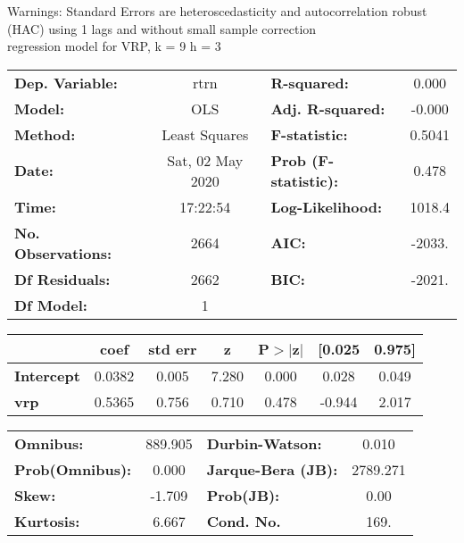 Warnings: \newline
 [1] Standard Errors are heteroscedasticity and autocorrelation robust (HAC) using 1 lags and without small sample correction\\ 

regression model for VRP, k = 9 h = 3\begin{center}
\begin{tabular}{lclc}
\toprule
\textbf{Dep. Variable:}    &       rtrn       & \textbf{  R-squared:         } &     0.000   \\
\textbf{Model:}            &       OLS        & \textbf{  Adj. R-squared:    } &    -0.000   \\
\textbf{Method:}           &  Least Squares   & \textbf{  F-statistic:       } &    0.5041   \\
\textbf{Date:}             & Sat, 02 May 2020 & \textbf{  Prob (F-statistic):} &    0.478    \\
\textbf{Time:}             &     17:22:54     & \textbf{  Log-Likelihood:    } &    1018.4   \\
\textbf{No. Observations:} &        2664      & \textbf{  AIC:               } &    -2033.   \\
\textbf{Df Residuals:}     &        2662      & \textbf{  BIC:               } &    -2021.   \\
\textbf{Df Model:}         &           1      & \textbf{                     } &             \\
\bottomrule
\end{tabular}
\begin{tabular}{lcccccc}
                   & \textbf{coef} & \textbf{std err} & \textbf{z} & \textbf{P$> |$z$|$} & \textbf{[0.025} & \textbf{0.975]}  \\
\midrule
\textbf{Intercept} &       0.0382  &        0.005     &     7.280  &         0.000        &        0.028    &        0.049     \\
\textbf{vrp}       &       0.5365  &        0.756     &     0.710  &         0.478        &       -0.944    &        2.017     \\
\bottomrule
\end{tabular}
\begin{tabular}{lclc}
\textbf{Omnibus:}       & 889.905 & \textbf{  Durbin-Watson:     } &    0.010  \\
\textbf{Prob(Omnibus):} &   0.000 & \textbf{  Jarque-Bera (JB):  } & 2789.271  \\
\textbf{Skew:}          &  -1.709 & \textbf{  Prob(JB):          } &     0.00  \\
\textbf{Kurtosis:}      &   6.667 & \textbf{  Cond. No.          } &     169.  \\
\bottomrule
\end{tabular}
\end{center}

